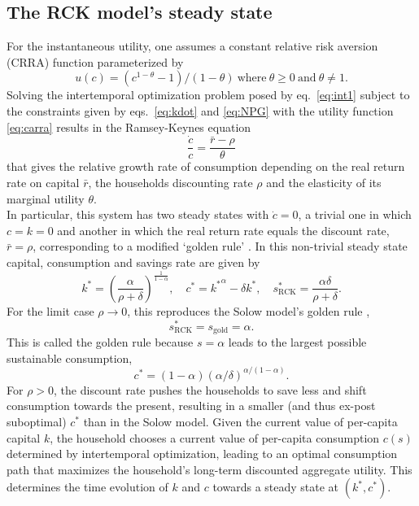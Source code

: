 \subsection{The RCK model's steady state}
For the instantaneous utility, one assumes a constant relative risk aversion (CRRA) function parameterized by
\begin{equation}
  u(c) = (c^{1-\theta} -1)/(1-\theta)~\mathrm{where}~\theta \geq0~\mathrm{and}~ \theta \neq 1.
  \label{eq:carra}
\end{equation}
Solving the intertemporal optimization problem posed by eq.~\eqref{eq:int1} subject to the constraints given by eqs.~\eqref{eq:kdot} and \eqref{eq:NPG} with the utility function \eqref{eq:carra} results in the Ramsey-Keynes equation
\begin{equation}
  \frac{\dot{c}}{c} = \frac{\bar{r} - \rho}{\theta}
  \label{eq:ramsey_keynes}
\end{equation}
that gives the relative growth rate of consumption depending on the real return rate on capital $\bar{r}$, the households discounting rate $\rho$ and the elasticity of its marginal utility $\theta$.\\

In particular, this system has two steady states with $\dot c\!=\!0$, a trivial one in which $c\!=\!k\!=\!0$ and another in which 
the real return rate equals the discount rate, $\bar r \!=\! \rho$, corresponding to a modified `golden rule' \citep[p. 300]{Acemoglu2009}. In this non-trivial steady state capital, consumption and savings rate are given by
\begin{equation}
	k^\ast = \left(\frac{\alpha}{\rho + \delta}\right)^{\frac{1}{1-\alpha}}, 
 	\quad c^\ast = {k^\ast}^{\alpha} -  \delta k^\ast,
 	\quad s^\ast_\mathrm{RCK} = \frac{\alpha \delta}{\rho + \delta}. \label{eq:rck_steady_state}
\end{equation}
For the limit case $\rho\to 0$, this reproduces the Solow model's golden rule \citep[p. 35]{Barro2004}, 
\begin{equation}
  s^\ast_\mathrm{RCK} \! =s_\mathrm{gold} \!=\! \alpha.
  \label{eq:golden_rule}
\end{equation}
This is called the golden rule because $s = \alpha$ leads to the largest possible sustainable consumption,
\begin{equation}
        c^\ast \! =\!(1\! -\! \alpha)(\alpha/\delta)^{\alpha/(1-\alpha)}.
        \label{eq:golden_rule_consumption}
\end{equation}
For $\rho \! > \!0$, the discount rate pushes the households to save less and shift consumption towards the present, resulting in a smaller (and thus ex-post suboptimal) $c^\ast$ than in the Solow model.
Given the current value of per-capita capital $k$, the household chooses a current value of per-capita consumption $c(s)$ determined by intertemporal optimization, leading to an optimal consumption path that maximizes the household's long-term discounted aggregate utility.  This determines the time evolution of $k$ and $c$ towards a steady state at $(k^\ast, c^\ast)$.


